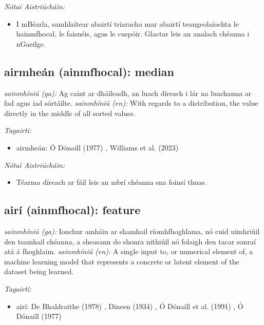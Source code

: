 \documentclass{article}
\begin{document}
 \noindent \textit{Nótaí Aistriúcháin:}
\begin{itemize}
	\item I mBéarla, samhlaítear abairtí triaracha mar abairtí teangeolaíochta le hainmfhocal, le faisnéis, agus le cuspóir. Glactar leis an analach chéanna i nGaeilge.
\end{itemize}


\subsection*{airmheán (ainmfhocal): median} 
 \noindent \textit{sainmhíniú (ga):} Ag caint ar dháileadh, an luach díreach i lár na luachanna ar fad agus iad sórtáilte.
\newline\newline
 \noindent \textit{sainmhíniú (en):} With regards to a distribution, the value directly in the middle of all sorted values.
\newline

 \noindent \textit{Tagairtí:}
\begin{itemize}
	\item airmheán: Ó Dónaill (1977) \cite{odonaill}, Williams et al. (2023) \cite{storchiste}
\end{itemize}

 \noindent \textit{Nótaí Aistriúcháin:}
\begin{itemize}
	\item Téarma díreach ar fáil leis an mbrí chéanna sna foinsí thuas.
\end{itemize}


\subsection*{airí (ainmfhocal): feature} 
 \noindent \textit{sainmhíniú (ga):} Ionchur amháin ar shamhail ríomhfhoghlama, nó cuid uimhriúil den tsamhail chéanna, a sheasann do shonra nithiúil nó folaigh den tacar sonraí atá á fhoghlaim.
\newline\newline
 \noindent \textit{sainmhíniú (en):} A single input to, or numerical element of, a machine learning model that represents a concrete or latent element of the dataset being learned.
\newline

 \noindent \textit{Tagairtí:}
\begin{itemize}
	\item airí: De Bhaldraithe (1978) \cite{de-bhaldraithe}, Dineen (1934) \cite{dineen}, Ó Dónaill et al. (1991) \cite{focloir-beag}, Ó Dónaill (1977) \cite{odonaill}
\end{itemize}
\end{document}
